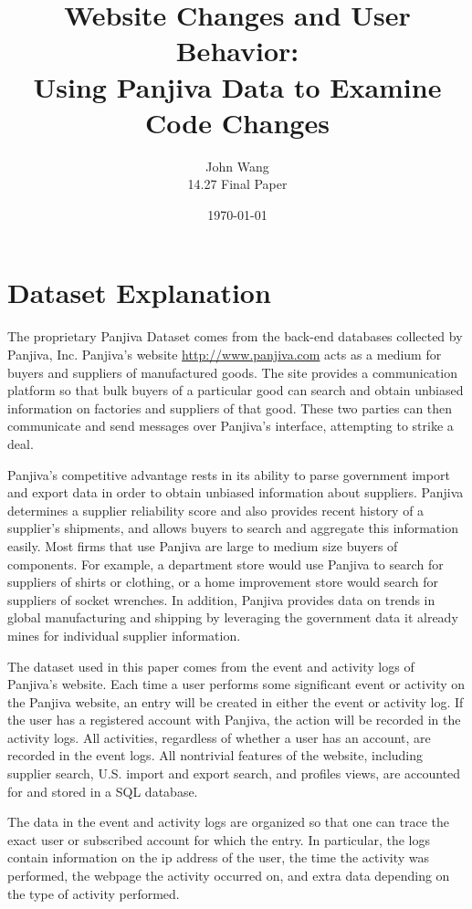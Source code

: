 \documentclass[10pt]{report}
\title{Website Changes and User Behavior: \\
Using Panjiva Data to Examine Code Changes}
\date{\today}
\author{John Wang \\
14.27 Final Paper}
\begin{document}
\maketitle


\tableofcontents

\newpage

\section{Dataset Explanation}

The proprietary Panjiva Dataset comes from the back-end databases collected by Panjiva, Inc. Panjiva's website \url{http://www.panjiva.com} acts as a medium for buyers and suppliers of manufactured goods. The site provides a communication platform so that bulk buyers of a particular good can search and obtain unbiased information on factories and suppliers of that good. These two parties can then communicate and send messages over Panjiva's interface, attempting to strike a deal. 

Panjiva's competitive advantage rests in its ability to parse government import and export data in order to obtain unbiased information about suppliers. Panjiva determines a supplier reliability score and also provides recent history of a supplier's shipments, and allows buyers to search and aggregate this information easily. Most firms that use Panjiva are large to medium size buyers of components. For example, a department store would use Panjiva to search for suppliers of shirts or clothing, or a home improvement store would search for suppliers of socket wrenches. In addition, Panjiva provides data on trends in global manufacturing and shipping by leveraging the government data it already mines for individual supplier information.

The dataset used in this paper comes from the event and activity logs of Panjiva's website. Each time a user performs some significant event or activity on the Panjiva website, an entry will be created in either the event or activity log. If the user has a registered account with Panjiva, the action will be recorded in the activity logs. All activities, regardless of whether a user has an account, are recorded in the event logs. All nontrivial features of the website, including supplier search, U.S. import and export search, and profiles views, are accounted for and stored in a SQL database.

The data in the event and activity logs are organized so that one can trace the exact user or subscribed account for which the entry. In particular, the logs contain information on the ip address of the user, the time the activity was performed, the webpage the activity occurred on, and extra data depending on the type of activity performed. 
\end{document}
